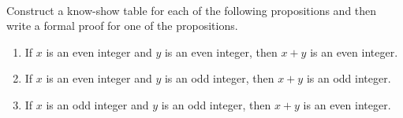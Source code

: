 \begin{prog} \label{prog:proving} \hfill \\
Construct a know-show table for each of the following propositions and then write a formal proof for one of the propositions.
\begin{enumerate}
  \item If $x$ is an even integer and $y$ is an even integer, then $x + y$ is an even integer.
  \item If $x$ is an even integer and $y$ is an odd integer, then $x + y$ is an odd integer.
  \item If $x$ is an odd integer and $y$ is an odd integer, then $x + y$ is an even integer.
\end{enumerate}
\end{prog}
\hbreak



\endinput

